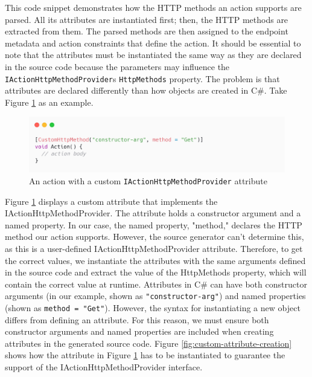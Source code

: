 This code snippet demonstrates how the HTTP methods an action supports are parsed. All its attributes are instantiated first; then, the HTTP methods are extracted from them. The parsed methods are then assigned to the endpoint metadata and action constraints that define the action. It should be essential to note that the attributes must be instantiated the same way as they are declared in the source code because the parameters may influence the \texttt{IActionHttpMethodProvider}s \texttt{HttpMethods} property. The problem is that attributes are declared differently than how objects are created in C\#. Take Figure \ref{fig:custom-http-method} as an example.

\begin{figure}[H]
\centering
\includegraphics[width=1\textwidth]{graphics/custom-http-method.png}
\caption{An action with a custom \texttt{IActionHttpMethodProvider} attribute}
\label{fig:custom-http-method}
\end{figure}

Figure \ref{fig:custom-http-method} displays a custom attribute that implements the IActionHttpMethodProvider. The attribute holds a constructor argument and a named property. In our case, the named property, "method," declares the HTTP method our action supports. However, the source generator can't determine this, as this is a user-defined IActionHttpMethodProvider attribute. Therefore, to get the correct values, we instantiate the attributes with the same arguments defined in the source code and extract the value of the HttpMethods property, which will contain the correct value at runtime. Attributes in C\# can have both constructor arguments (in our example, shown as \texttt{"constructor-arg"}) and named properties (shown as \texttt{method = "Get"}). However, the syntax for instantiating a new object differs from defining an attribute. For this reason, we must ensure both constructor arguments and named properties are included when creating attributes in the generated source code. Figure \ref{fig:custom-attribute-creation} shows how the attribute in Figure \ref{fig:custom-http-method} has to be instantiated to guarantee the support of the IActionHttpMethodProvider interface.

